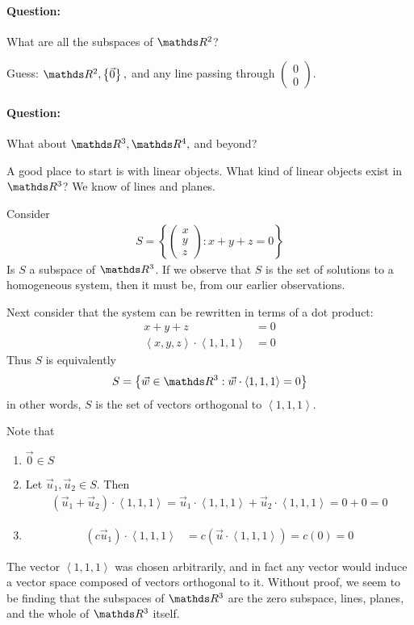 \documentclass[11pt]{article}
\newcommand{\ques}{\paragraph{Question:}}
\newcommand{\vek}[1]{\vec{#1}}
\begin{document}
\ques What are all the subspaces of $\bbR^2$?

Guess: $\bbR^2, \left\{ \vek{0} \right\},$ and any line passing through $\begin{pmatrix}0 \\ 0\end{pmatrix}$.

\ques What about $\bbR^3, \bbR^4,$ and beyond?

A good place to start is with linear objects. What kind of linear objects exist in $\bbR^3$? We know of lines and planes.

Consider
\begin{align*}
S = \left\{ \begin{pmatrix}x \\ y \\ z\end{pmatrix} : x + y + z = 0 \right\}
\end{align*}
Is $S$ a subspace of $\bbR^3$. If we observe that $S$ is the set of solutions to a homogeneous system, then it must be, from our earlier observations.

Next consider that the system can be rewritten in terms of a dot product:
\begin{align*}
x + y + z &= 0
\\
\left\langle x, y, z \right\rangle \cdot \left\langle 1, 1, 1 \right\rangle &= 0
\end{align*}
Thus $S$ is equivalently
\begin{align*}
S = \left\{ \vek{w} \in \bbR^3 : \vek{w} \cdot \left\langle 1,1,1 \right\rangle = 0 \right\}
\end{align*}
in other words, $S$ is the set of vectors orthogonal to $\left\langle 1,1,1 \right\rangle$.

Note that
\begin{enumerate}
\item{
$\vek{0} \in S$
}
\item{
Let $\vek{u}_1, \vek{u}_2 \in S$. Then
\begin{align*}
\left( \vek{u}_1 + \vek{u}_2 \right) \cdot \left\langle 1,1,1 \right\rangle
= \vek{u}_1 \cdot \left\langle 1,1,1 \right\rangle + \vek{u}_2 \cdot \left\langle 1,1,1 \right\rangle
= 0 + 0
= 0
\end{align*}
}
\item{
\begin{align*}
\left( c \vek{u}_1 \right) \cdot \left\langle 1,1,1 \right\rangle &= c \left( \vek{u} \cdot \left\langle 1,1,1 \right\rangle \right) = c(0) = 0
\end{align*}
}
\end{enumerate}
The vector $\left\langle 1,1,1 \right\rangle$ was chosen arbitrarily, and in fact any vector would induce a vector space composed of vectors orthogonal to it. Without proof, we seem to be finding that the subspaces of $\bbR^3$ are the zero subspace, lines, planes, and the whole of $\bbR^3$ itself.
\end{document}
